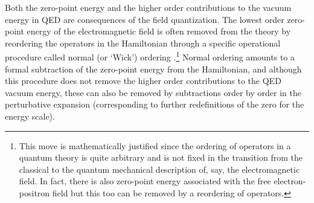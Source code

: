 \documentclass[12pt]{article}
\begin{document}
Both the zero-point energy and the higher order contributions to
the vacuum energy in QED are consequences of the field
quantization. The lowest order zero-point energy of the
electromagnetic field is often removed from the theory by
reordering the operators in the Hamiltonian through a specific
operational procedure called normal (or `Wick') ordering
\cite{wick50}.\footnote{This move is mathematically justified
since the ordering of operators in a quantum theory is quite
arbitrary and is not fixed in the transition from the classical to
the quantum mechanical description of, say, the electromagnetic
field. In fact, there is also zero-point energy associated with
the free electron-positron field but this too can be removed by a
reordering of operators.} Normal ordering amounts to a formal
subtraction of the zero-point energy from the Hamiltonian, and
although this procedure does not remove the higher order
contributions to the QED vacuum energy, these can also be removed
by subtractions order by order in the perturbative expansion
(corresponding to further redefinitions of the zero for the energy
scale). 
\end{document}
